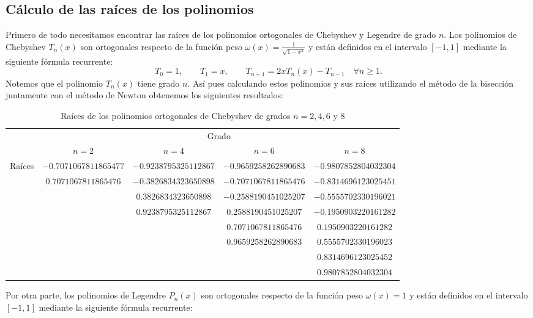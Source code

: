 \documentclass[a4paper]{article}
\begin{document}
\subsection*{Cálculo de las raíces de los polinomios}
Primero de todo necesitamos encontrar las raíces de los polinomios ortogonales de Chebyshev y Legendre de grado $n$. Los polinomios de Chebyshev $T_n(x)$ son ortogonales respecto de la función peso $\omega(x)=\frac{1}{\sqrt{1-x^2}}$ y están definidos en el intervalo $[-1,1]$ mediante la siguiente fórmula recurrente:
$$T_0=1,\qquad T_1=x,\qquad T_{n+1}=2xT_n(x)-T_{n-1}\quad\forall n\geq 1.$$ Notemos que el polinomio $T_n(x)$ tiene grado $n$. Así pues calculando estos polinomios y sus raíces utilizando el método de la bisección juntamente con el método de Newton obtenemos los siguientes resultados:
\begin{table}[ht]
    \centering
    \begin{tabular}{|c|c|c|c|c|}
        \cline{2-5}
        \multicolumn{1}{c|}{} & \multicolumn{4}{c|}{Grado}\\
        \cline{2-5}
        \multicolumn{1}{c|}{} & $n=2$ & $n=4$ & $n=6$ & $n=8$ \\
        \hline
        \multirow{8}{*}{Raíces} & $-0.7071067811865477$ & $-0.9238795325112867$ & $-0.9659258262890683$ & $-0.9807852804032304$ \\
        & $0.7071067811865476$ & $-0.3826834323650898$ & $-0.7071067811865476$ & $-0.8314696123025451$ \\
        & & $0.3826834323650898$ & $-0.2588190451025207$ & $-0.5555702330196021$ \\
        & & $0.9238795325112867$ & $0.2588190451025207$ & $-0.1950903220161282$ \\
        & & & $0.7071067811865476$ & $0.1950903220161282$ \\
        & & & $0.9659258262890683$ & $0.5555702330196023$ \\
        & & & & $0.8314696123025452$ \\
        & & & & $0.9807852804032304$ \\
        \hline
    \end{tabular}
    \caption{Raíces de los polinomios ortogonales de Chebyshev de grados $n=2,4,6\text{ y }8$}
\end{table}\par
Por otra parte, los polinomios de Legendre $P_n(x)$ son ortogonales respecto de la función peso $\omega(x)=1$ y están definidos en el intervalo $[-1,1]$ mediante la siguiente fórmula recurrente:
\end{document}

